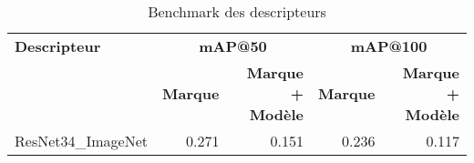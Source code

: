\begin{table}[H]
\centering
\begin{tabular}{l|rr|rr}
\toprule
\textbf{Descripteur} & \multicolumn{2}{c}{\textbf{mAP@50}} & \multicolumn{2}{c}{\textbf{mAP@100}} \\
 & \textbf{Marque} & \textbf{Marque + Modèle} & \textbf{Marque} & \textbf{Marque + Modèle} \\
\midrule
ResNet34\_ImageNet & 0.271 & 0.151 & 0.236 & 0.117 \\
\bottomrule
\end{tabular}
\caption{Benchmark des descripteurs}
\label{tab:results}
\end{table}
